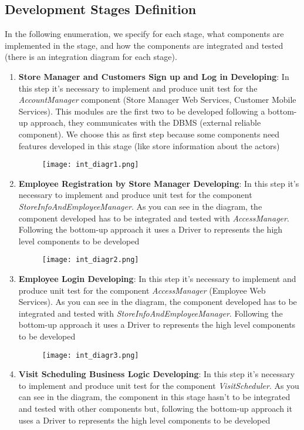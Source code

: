     \subsection{Development Stages Definition}
    In the following enumeration, we specify for each stage, what components are implemented in the stage, and how the components are integrated and tested (there is an integration diagram for each stage).        
    \begin{enumerate}
            \item \textbf{Store Manager and Customers Sign up and Log in Developing}: In this step it's necessary to implement and produce unit test for the \textit{AccountManager} component (Store Manager Web Services, Customer Mobile Services). This modules are the first two to be developed following a bottom-up approach, they communicates with the DBMS (external reliable component). We choose this as first step because some components need features developed in this stage (like store information about the actors) \begin{figure}[H]
                \centering
                \texttt{[image: int\_diagr1.png]}
            \end{figure}
            \item \textbf{Employee Registration by Store Manager Developing}: In this step it's necessary to implement and produce unit test for the component \textit{StoreInfoAndEmployeeManager}. As you can see in the diagram, the component developed has to be integrated and tested with \textit{AccessManager}. Following the bottom-up approach it uses a Driver to represents the high level components to be developed  \begin{figure}[H]
                \centering
                \texttt{[image: int\_diagr2.png]}
            \end{figure}
            \item \textbf{Employee Login Developing}: In this step it's necessary to implement and produce unit test for the component \textit{AccessManager} (Employee Web Services). As you can see in the diagram, the component developed has to be integrated and tested with \textit{StoreInfoAndEmployeeManager}. Following the bottom-up approach it uses a Driver to represents the high level components to be developed \begin{figure}[H]
                \centering
                \texttt{[image: int\_diagr3.png]}
            \end{figure}
            \item \textbf{Visit Scheduling Business Logic Developing}: In this step it's necessary to implement and produce unit test for the component \textit{VisitScheduler}. As you can see in the diagram, the component in this stage hasn't to be integrated and tested with other components but, following the bottom-up approach it uses a Driver to represents the high level components to be developed \begin{figure}[H]

\end{figure}
\end{enumerate}
